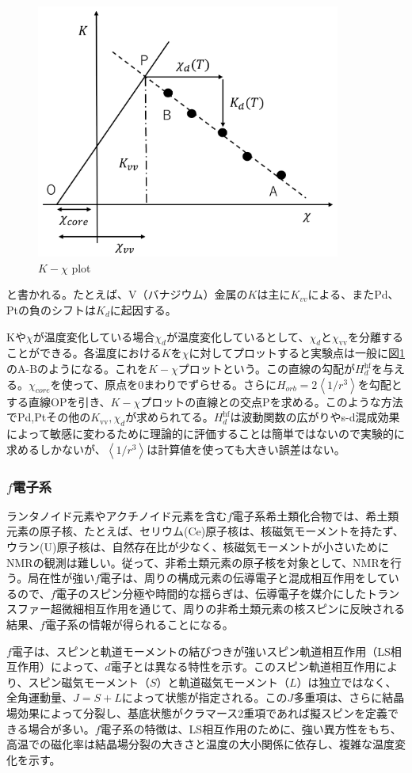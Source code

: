 \documentclass[11pt,a4j]{jreport}
\begin{document}
\begin{figure}[htbp]
  \centering
  \vspace{10mm}
  \includegraphics[width=100mm]{./figure/K-X_plot.png}
  \caption{$K-\chi$ plot}
  \label{K-X_plot}
\end{figure}
と書かれる。たとえば、V（バナジウム）金属の$K$は主に$K_{vv}$による、またPd、Ptの負のシフトは$K_d$に起因する。\par
Kや$\chi$が温度変化している場合$\chi_d$が温度変化しているとして、$\chi_d$と$\chi_{\text{vv}}$を分離することができる。各温度における$K$を$\chi$に対してプロットすると実験点は一般に図\ref{K-X_plot}のA-Bのようになる。これを$K-\chi$プロットという。この直線の勾配が$H_{d}^{\text{hf}}$を与える。$\chi_{core}$を使って、原点を0まわりでずらせる。さらに$H_{orb}=2\left\langle1/r^3\right\rangle $を勾配とする直線OPを引き、$K-\chi$プロットの直線との交点Pを求める。このような方法でPd,Ptその他の$K_{\text{vv}},\chi_d$が求められてる。$H_{d}^{\text{hf}}$は波動関数の広がりやs-d混成効果によって敏感に変わるために理論的に評価することは簡単ではないので実験的に求めるしかないが、$\left\langle 1/r^3 \right\rangle$は計算値を使っても大きい誤差はない。

\subsubsection{$f$電子系}
ランタノイド元素やアクチノイド元素を含む$f$電子系希土類化合物では、希土類元素の原子核、たとえば、セリウム(Ce)原子核は、核磁気モーメントを持たず、ウラン(U)原子核は、自然存在比が少なく、核磁気モーメントが小さいためにNMRの観測は難しい。従って、非希土類元素の原子核を対象として、NMRを行う。局在性が強い$f$電子は、周りの構成元素の伝導電子と混成相互作用をしているので、$f$電子のスピン分極や時間的な揺らぎは、伝導電子を媒介にしたトランスファー超微細相互作用を通じて、周りの非希土類元素の核スピンに反映される結果、$f$電子系の情報が得られることになる。\par
$f$電子は、スピンと軌道モーメントの結びつきが強いスピン軌道相互作用（LS相互作用）によって、$d$電子とは異なる特性を示す。このスピン軌道相互作用により、スピン磁気モーメント（$S$）と軌道磁気モーメント（$L$）は独立ではなく、全角運動量、$J = S + L$によって状態が指定される。この$J$多重項は、さらに結晶場効果によって分裂し、基底状態がクラマース2重項であれば擬スピンを定義できる場合が多い。$f$電子系の特徴は、LS相互作用のために、強い異方性をもち、高温での磁化率は結晶場分裂の大きさと温度の大小関係に依存し、複雑な温度変化を示す。
\end{document}
